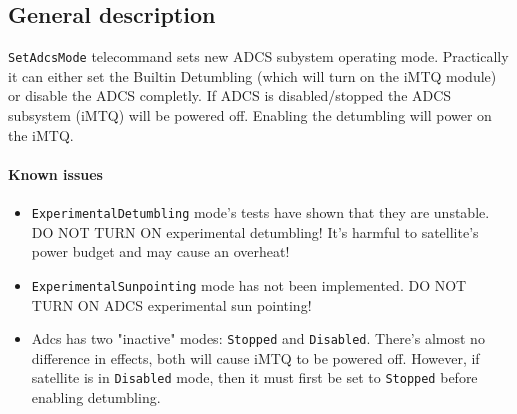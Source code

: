 

\subsection{General description}
\texttt{SetAdcsMode} telecommand sets new ADCS subystem operating mode. Practically it can either set the Builtin Detumbling (which will turn on the iMTQ module) or disable the ADCS completly. If ADCS is disabled/stopped the ADCS subsystem (iMTQ) will be powered off. Enabling the detumbling will power on the iMTQ.

\paragraph{Known issues}
\begin{itemize}
    \item \danger \texttt{ExperimentalDetumbling} mode's tests have shown that they are unstable.
    DO NOT TURN ON experimental detumbling! It's harmful to satellite's power budget and may cause an overheat!
    \item \danger \texttt{ExperimentalSunpointing} mode has not been implemented. DO NOT TURN ON ADCS experimental sun pointing!
    \item \warn Adcs has two "inactive" modes: \texttt{Stopped} and \texttt{Disabled}. There's almost no difference in effects, both will cause iMTQ to be powered off. However, if satellite is in \texttt{Disabled} mode, then it must first be set to \texttt{Stopped} before enabling detumbling.
\end{itemize}

